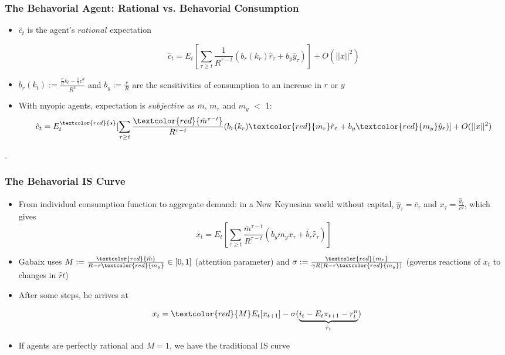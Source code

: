 \documentclass{beamer}
\begin{document}
\begin{frame}
\frametitle{The Behavorial Agent: Rational vs. Behavorial Consumption}
\begin{itemize}
\item $\hat c_{t}$ is the agent's $rational$ expectation 

		$$\hat c_{t}=E_{t}[\sum_{\tau \geq t}\frac{1}{R^{\tau-t}}(b_{r}(k_{r})\hat r_{\tau}+b_{y}\hat y_{\tau})]+O(||x||^2)$$
\item  $b_{r}(k_{t}):=\frac {\frac {r}{R}k_{t}-\frac {1}{\gamma}c^{d}}{R^{2}}$ and $b_{y}:=\frac {r}{R}$ are the sensitivities of consumption to an increase in $r$ or $y$

\item With myopic agents, expectation is $subjective$ as $\bar m$, $m_{r}$ and $m_{y}$  $<$ 1: $$\hat c_{t}=E_{t}^{\textcolor{red}{s}}[\sum_{\tau \geq t}\frac{\textcolor{red}{\bar m^{\tau-t}}}{R^{\tau-t}}(b_{r}(k_{r})\textcolor{red}{m_{r}}\hat r_{\tau}+b_{y}\textcolor{red}{m_{y}}\hat y_{\tau})]+O(||x||^2)$$

\end{itemize}.

\end{frame}


\begin{frame}
\frametitle{The Behavorial IS Curve}
\begin{itemize}
\item From individual consumption function to aggregate demand: in a New Keynesian world without capital, $\hat y_{\tau}=\hat c_{\tau}$ and $x_{\tau}=\frac {\hat y_{\tau}}{c^{d}}$, which gives
	$$x_{t}=E_{t}[\sum_{\tau \geq t}\frac{\bar m^{\tau-t}}{R^{\tau-t}}(b_{y}m_{y}x_{\tau}+\tilde{b_{r}}\hat r_{\tau})]$$
\item Gabaix uses $M:=\frac{\textcolor{red}{\bar m}}{R-r\textcolor{red}{m_{y}}}\in [0,1]$ (attention parameter) and $\sigma:=\frac{\textcolor{red}{m_{r}}}{\gamma R(R-r\textcolor{red}{m_{y}})}$ (governs reactions of $x_{t}$ to changes in $\hat r{t}$)
\item After some steps, he arrives at
\end{itemize}

	$$x_{t}=\textcolor{red}{M}E_{t}[x_{t+1}]-\sigma(\underbrace{i_{t}-E_{t}\pi_{t+1}-r_{t}^{n}}_\text{$\hat r_{t}$})$$

\begin{itemize}
\item If agents are perfectly rational and $M=1$, we have the traditional IS curve
\end{itemize}
\end{frame}
\end{document}
